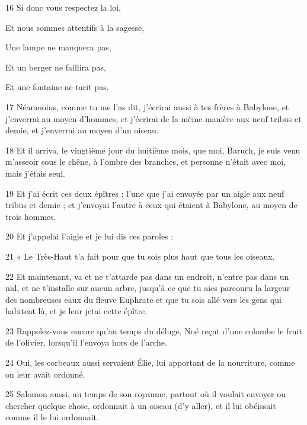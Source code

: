 \par 16 Si donc vous respectez la loi,

\par Et nous sommes attentifs à la sagesse,

\par Une lampe ne manquera pas,

\par Et un berger ne faillira pas,

\par Et une fontaine ne tarit pas.

\par 17 Néanmoins, comme tu me l'as dit, j'écrirai aussi à tes frères à Babylone, et j'enverrai au moyen d'hommes, et j'écrirai de la même manière aux neuf tribus et demie, et j'enverrai au moyen d'un oiseau.

\par 18 Et il arriva, le vingtième jour du huitième mois, que moi, Baruch, je suis venu m'asseoir sous le chêne, à l'ombre des branches, et personne n'était avec moi, mais j'étais seul.

\par 19 Et j'ai écrit ces deux épîtres : l'une que j'ai envoyée par un aigle aux neuf tribus et demie ; et j'envoyai l'autre à ceux qui étaient à Babylone, au moyen de trois hommes.

\par 20 Et j'appelai l'aigle et je lui dis ces paroles :

\par 21 « Le Très-Haut t'a fait pour que tu sois plus haut que tous les oiseaux.

\par 22 Et maintenant, va et ne t'attarde pas dans un endroit, n'entre pas dans un nid, et ne t'installe sur aucun arbre, jusqu'à ce que tu aies parcouru la largeur des nombreuses eaux du fleuve Euphrate et que tu sois allé vers les gens qui habitent là, et je leur jetai cette épître.

\par 23 Rappelez-vous encore qu'au temps du déluge, Noé reçut d'une colombe le fruit de l'olivier, lorsqu'il l'envoya hors de l'arche.

\par 24 Oui, les corbeaux aussi servaient Élie, lui apportant de la nourriture, comme on leur avait ordonné.

\par 25 Salomon aussi, au temps de son royaume, partout où il voulait envoyer ou chercher quelque chose, ordonnait à un oiseau (d'y aller), et il lui obéissait comme il le lui ordonnait.

